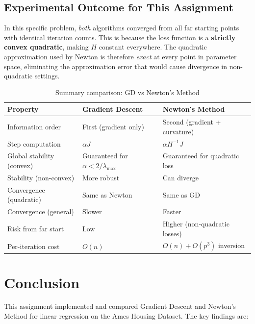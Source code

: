 \documentclass[12pt,a4paper]{article}
\begin{document}
\subsection{Experimental Outcome for This Assignment}

In this specific problem, \textit{both} algorithms converged from all far starting
points with identical iteration counts. This is because the loss function is a
\textbf{strictly convex quadratic}, making $H$ constant everywhere. The quadratic
approximation used by Newton is therefore \textit{exact} at every point in parameter
space, eliminating the approximation error that would cause divergence in non-quadratic
settings.

\begin{table}[H]
\centering
\caption{Summary comparison: GD vs Newton's Method}
\begin{tabular}{lll}
    \toprule
    Property & Gradient Descent & Newton's Method \\
    \midrule
    Information order & First (gradient only) & Second (gradient + curvature) \\
    Step computation & $\alpha J$ & $\alpha H^{-1} J$ \\
    Global stability (convex) & Guaranteed for $\alpha < 2/\lambda_{\max}$ & Guaranteed for quadratic loss \\
    Stability (non-convex) & More robust & Can diverge \\
    Convergence (quadratic) & Same as Newton & Same as GD \\
    Convergence (general) & Slower & Faster \\
    Risk from far start & Low & Higher (non-quadratic losses) \\
    Per-iteration cost & $O(n)$ & $O(n) + O(p^3)$ inversion \\
    \bottomrule
\end{tabular}
\end{table}

\section{Conclusion}

This assignment implemented and compared Gradient Descent and Newton's Method for
linear regression on the Ames Housing Dataset. The key findings are:
\end{document}
